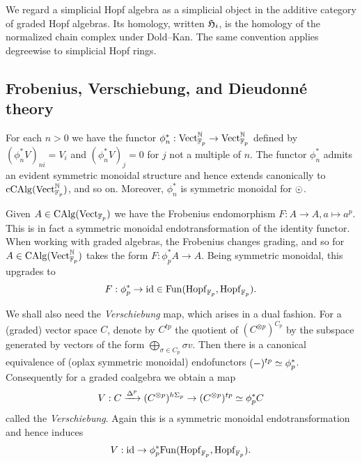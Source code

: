We regard a simplicial Hopf algebra as a simplicial object in the additive category of graded Hopf algebras. Its homology, written $\mathfrak H_i$, is the homology of the normalized chain complex under Dold--Kan. The same convention applies degreewise to simplicial Hopf rings.

\subsection{Frobenius, Verschiebung, and Dieudonn\'e theory}\label{app:rw-witt}

For each $n>0$ we have the functor $\phi_n^*: \mathrm{Vect}_{\mathbb{F}_p}^{\mathbb{N}} \to \mathrm{Vect}_{\mathbb{F}_p}^{\mathbb{N}}$ defined by $(\phi_n^*V)_{ni} = V_i$ and $(\phi_n^*V)_j = 0$ for $j$ not a multiple of $n$.
The functor $\phi_n^*$ admits an evident symmetric monoidal structure and hence extends canonically to $\mathrm{cCAlg}(\mathrm{Vect}_{\mathbb{F}_p}^{\mathbb{N}})$, and so on.
Moreover, $\phi_n^*$ is symmetric monoidal for $\odot$.

Given $A \in \mathrm{CAlg}(\mathrm{Vect}_{\mathbb{F}_p})$ we have the Frobenius endomorphism $F: A \to A, a \mapsto a^p$.
This is in fact a symmetric monoidal endotransformation of the identity functor.
When working with graded algebras, the Frobenius changes grading, and so for $A \in \mathrm{CAlg}(\mathrm{Vect}_{\mathbb{F}_p}^{\mathbb{N}})$ takes the form $F: \phi_p^* A \to A$.
Being symmetric monoidal, this upgrades to \[ F:\phi_p^* \to \operatorname{id} \in \mathrm{Fun}(\mathrm{Hopf}_{\mathbb{F}_p}, \mathrm{Hopf}_{\mathbb{F}_p}). \]

We shall also need the \emph{Verschiebung} map, which arises in a dual fashion.
For a (graded) vector space $C$, denote by $C^{tp}$ the quotient of $(C^{\otimes p})^{C_p}$ by the subspace generated by vectors of the form $\bigoplus_{\sigma \in C_p} \sigma v$.
Then there is a canonical equivalence of (oplax symmetric monoidal) endofunctors $(\mathord-)^{tp} \simeq \phi_p^*$.
Consequently for a graded coalgebra we obtain a map \[ V: C \xrightarrow{\Delta^p} (C^{\otimes p})^{h\Sigma_p} \to (C^{\otimes p})^{tp} \simeq \phi_p^* C \] called the \emph{Verschiebung}.
Again this is a symmetric monoidal endotransformation and hence induces \[ V: \operatorname{id} \to \phi_p^*  \mathrm{Fun}(\mathrm{Hopf}_{\mathbb{F}_p}, \mathrm{Hopf}_{\mathbb{F}_p}). \]

